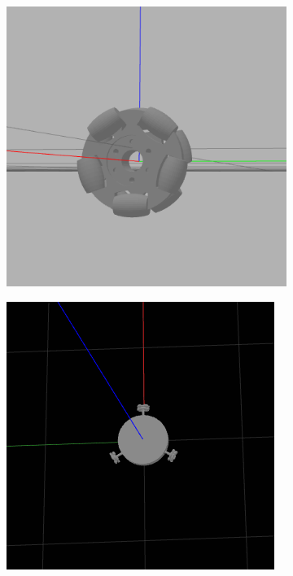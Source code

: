 \documentclass[12pt]{report}
\begin{document}
\renewcommand{\thefigure}{6}
\begin{figure}[h]
\begin{subfigure}{0.48\textwidth}
    \includegraphics[width=\linewidth]{wheel.png}
    \caption{} \label{fig:wheel}
  \end{subfigure}%
  \hspace*{\fill}   %
  \begin{subfigure}{0.48\textwidth}
    \includegraphics[width=\linewidth]{single_robot.png}

\end{subfigure}
\end{figure}
\end{document}
